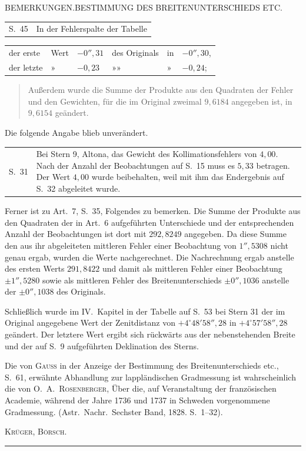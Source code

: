 \clearpage
\noindent{}\parbox{\dimexpr\linewidth-4em\relax}{\centering\small BEMERKUNGEN.\quad BESTIMMUNG DES BREITENUNTERSCHIEDS ETC.}\hfill\mbox{}\par
{\small
\par\noindent\begin{tabular}{@{}p{.065\linewidth}p{.91\linewidth}@{}}
S.\ 45&In der Fehlerspalte der Tabelle
\end{tabular}
\begin{center}
\par\noindent\begin{tabular}{llllll}
der erste&Wert&$-0''{,}31$&des Originals&in&$-0''{,}30$,\\
der letzte&»&$-0{,}23$&»\quad »&»&$-0{,}24$;
\end{tabular}
\end{center}
\begin{quote}
Außerdem wurde die Summe der Produkte aus den Quadraten der Fehler und den Gewichten,
für die im Original zweimal $9{,}6184$ angegeben ist, in $9{,}6154$ geändert.
\end{quote}
Die folgende Angabe blieb unverändert.
\par\noindent\begin{tabular}{@{}p{.065\linewidth}p{.91\linewidth}@{}}
S.\ 31&Bei Stern 9, Altona, das Gewicht des Kollimationsfehlers von $4{,}00$. Nach der Anzahl der
Beobachtungen auf S.\ 15 muss es $5{,}33$ betragen. Der Wert $4{,}00$ wurde beibehalten, weil mit ihm
das Endergebnis auf S.\ 32 abgeleitet wurde.
\end{tabular}

Ferner ist zu Art.\ 7, S.\ 35, Folgendes zu bemerken. Die Summe der Produkte aus den Quadraten
der in Art.\ 6 aufgeführten Unterschiede und der entsprechenden Anzahl der Beobachtungen ist dort
mit $292{,}8249$ angegeben. Da diese Summe den aus ihr abgeleiteten mittleren
Fehler einer Beobachtung von $1''{,}5308$ nicht genau ergab, wurden die Werte nachgerechnet.
Die Nachrechnung ergab anstelle des ersten Werts $291{,}8422$ und damit als mittleren Fehler
einer Beobachtung $\pm1''{,}5280$ sowie als mittleren Fehler des Breitenunterschieds
$\pm0''{,}1036$ anstelle der $\pm0''{,}1038$ des Originals.

Schließlich wurde im IV.\ Kapitel in der Tabelle auf S.\ 53 bei Stern 31 der im Original
angegebene Wert der Zenitdistanz von $+4^\circ48'58''{,}28$ in $+4^\circ57'58''{,}28$ geändert.
Der letztere Wert ergibt sich rückwärts aus der nebenstehenden Breite und der auf S.\ 9
aufgeführten Deklination des Sterns.

Die von \textsc{Gauss} in der Anzeige der Bestimmung des Breitenunterschieds etc., S.\ 61,
erwähnte Abhandlung zur lappländischen Gradmessung ist wahrscheinlich die von
O.\ A.\ \textsc{Rosenberger}, Über die, auf Veranstaltung der französischen Academie, während
der Jahre 1736 und 1737 in Schweden vorgenommene Gradmessung. (Astr.\ Nachr.\ Sechster Band,
1828. S.\ 1--32).
\par\hfill\textsc{Krüger, Börsch.}\par
}
\begin{center}\rule{.25\textwidth}{.4pt}\end{center}

